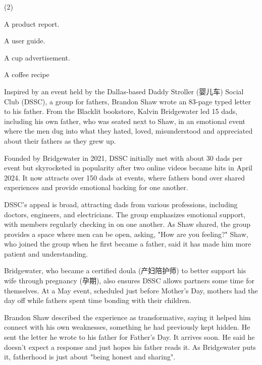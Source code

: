 \documentclass{英语试卷}
\begin{document}
\begin{choices}(2)
  \item A product report.
  \item A user guide.
  \item A cup advertisement.
  \item A coffee recipe
\end{choices}
\par Inspired by an event held by the Dallas-based Daddy Stroller (婴儿车) Social Club (DSSC), a group for fathers, Brandon Shaw wrote an 83-page typed letter to his father. From the Blacklit bookstore, Kalvin Bridgewater led 15 dads, including his own father, who was seated next to Shaw, in an emotional event where the men dug into what they hated, loved, misunderstood and appreciated about their fathers as they grew up.\par
\par Founded by Bridgewater in 2021, DSSC initially met with about 30 dads per event but skyrocketed in popularity after two online videos became hits in April 2024. It now attracts over 150 dads at events, where fathers bond over shared experiences and provide emotional backing for one another.\par
\par DSSC's appeal is broad, attracting dads from various professions, including doctors, engineers, and electricians. The group emphasizes emotional support, with members regularly checking in on one another. As Shaw shared, the group provides a space where men can be open, asking, "How are you feeling?" Shaw, who joined the group when he first became a father, said it has made him more patient and understanding.\par
\par Bridgewater, who became a certified doula (产妇陪护师) to better support his wife through pregnancy (孕期), also ensures DSSC allows partners some time for themselves. At a May event, scheduled just before Mother's Day, mothers had the day off while fathers spent time bonding with their children.\par
\par Brandon Shaw described the experience as transformative, saying it helped him connect with his own weaknesses, something he had previously kept hidden. He sent the letter he wrote to his father for Father's Day. It arrives soon. He said he doesn't expect a response and just hopes his father reads it. As Bridgewater puts it, fatherhood is just about "being honest and sharing".\par
\end{document}
